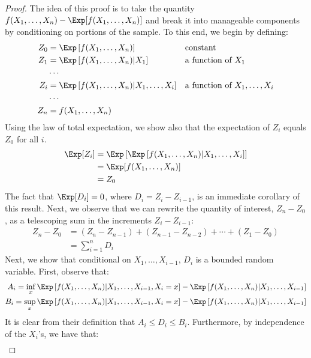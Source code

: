 \begin{proof}
    The idea of this proof is to take the quantity $f(X_1,\dots,X_n) - \Exp[f(X_1,\dots,X_n)]$ and break it into manageable components by conditioning on portions of the sample. To this end, we begin by defining:
	\begin{align*}
	 	Z_0 &= \Exp \left[f(X_1,\dots,X_n) \right] &&\text{constant}\\
	 	Z_1 &= \Exp \left[f(X_1,\dots,X_n) \lvert X_1 \right] &&\text{a function of $X_1$} \\
        &\cdots \\
        Z_i &= \Exp \left [f(X_1,\dots,X_n) | X_1,\dots,X_i \right] &&\text{a function of $X_1,\dots,X_i$} \\
	 	&\cdots \\
        Z_n &= f(X_1,\dots,X_n)
	\end{align*}
    Using the law of total expectation, we show also that the expectation of $Z_i$ equals $Z_0$ for all $i$.
    \begin{align*}
        \Exp [Z_i] &= \Exp \left [ \Exp \left [f(X_1,\dots,X_n) | X_1,\dots,X_i \right] \right] \\
        &= \Exp[f(X_1,\dots,X_n)] \\
        &= Z_0
    \end{align*}
    The fact that $\Exp[D_i] = 0$, where $D_i = Z_i - Z_{i - 1}$, is an immediate corollary of this result. Next, we observe that we can rewrite the quantity of interest, $Z_n - Z_0$, as a telescoping sum in the increments $Z_i - Z_{i - 1}$:
    \begin{align*}
        Z_n - Z_0 &= (Z_n - Z_{n - 1}) + (Z_{n - 1} - Z_{n - 2}) + \cdots + (Z_1 - Z_0) \\
        &= \sum_{i = 1}^n D_i
    \end{align*} 
    Next, we show that conditional on $X_1,\dots,X_{i - 1}$, $D_i$ is a bounded random variable. First, observe that:
    \begin{align*}
        A_i = \inf_x \Exp \left[ f(X_1,\dots,X_n) | X_1,\dots,X_{i - 1}, X_i = x \right] - \Exp \left[ f(X_1,\dots,X_n) | X_1,\dots,X_{i - 1} \right] \\
        B_i = \sup_x \Exp \left [ f(X_1,\dots,X_n) | X_1,\dots,X_{i - 1}, X_i = x \right] - \Exp \left[ f(X_1,\dots,X_n) | X_1,\dots,X_{i - 1} \right]
    \end{align*}
    It is clear from their definition that $A_i \leq D_i \leq B_i$. Furthermore, by independence of the $X_i$'s, we have that:
    \begin{align*}

\end{align*}
\end{proof}
